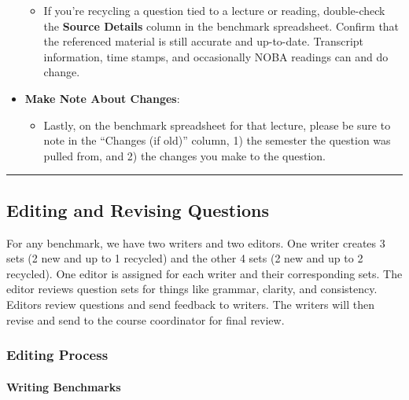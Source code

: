\documentclass[
]{article}
\providecommand{\tightlist}{%
  \setlength{\itemsep}{0pt}\setlength{\parskip}{0pt}}
\begin{document}
\begin{itemize}
  \begin{itemize}
  \tightlist
  \item
    If you're recycling a question tied to a lecture or reading, double-check the \textbf{Source Details} column in the benchmark spreadsheet. Confirm that the referenced material is still accurate and up-to-date. Transcript information, time stamps, and occasionally NOBA readings can and do change.
  \end{itemize}
\item
  \textbf{Make Note About Changes}:

  \begin{itemize}
  \tightlist
  \item
    Lastly, on the benchmark spreadsheet for that lecture, please be sure to note in the ``Changes (if old)'' column, 1) the semester the question was pulled from, and 2) the changes you make to the question.
  \end{itemize}
\end{itemize}

\begin{center}\rule{0.5\linewidth}{0.5pt}\end{center}

\hypertarget{editing-and-revising-questions}{%
\subsection{Editing and Revising Questions}\label{editing-and-revising-questions}}

For any benchmark, we have two writers and two editors. One writer creates 3 sets (2 new and up to 1 recycled) and the other 4 sets (2 new and up to 2 recycled). One editor is assigned for each writer and their corresponding sets. The editor reviews question sets for things like grammar, clarity, and consistency. Editors review questions and send feedback to writers. The writers will then revise and send to the course coordinator for final review.

\hypertarget{editing-process}{%
\subsubsection{Editing Process}\label{editing-process}}

\hypertarget{writing-benchmarks}{%
\paragraph{Writing Benchmarks}\label{writing-benchmarks}}
\end{document}
